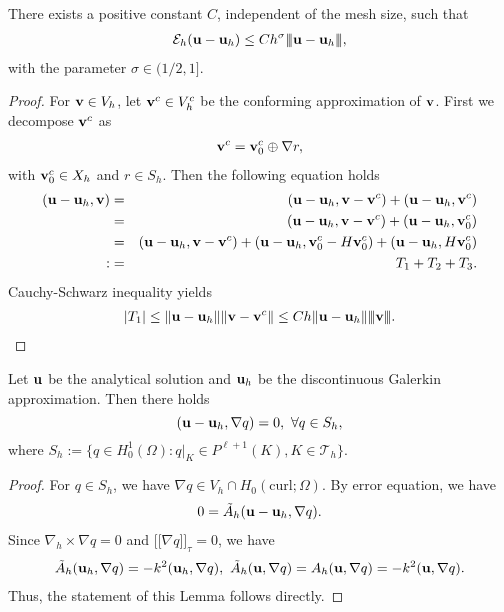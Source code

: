 \documentclass[final,leqno]{siamltex704}
\newcommand{\bv}{{\bf v}}
\def\bu{{\bf u}}
\def\bv{{\bf v}}
\def\ljump{{[\![}}
\def\rjump{{]\!]}}
\def\3bar{{|\hspace{-.02in}|\hspace{-.02in}|}}
\begin{document}
\begin{lemma}
There exists a positive constant $C$, independent of the mesh size, such that
\begin{eqnarray}
\mathcal{E}_h(\bu-\bu_h)\le Ch^{\sigma}\3bar\bu-\bu_h\3bar,
\end{eqnarray}
with the parameter $\sigma\in (1/2,1]$.
\end{lemma}
\begin{proof}
For $\bv\in V_h$, let $\bv^c\in V_h^c$ be the conforming approximation of $\bv$. First we decompose $\bv^c$ as
\begin{eqnarray}
\bv^c=\bv_0^c\oplus\nabla r,
\end{eqnarray}
with $\bv_0^c\in X_h$ and $r\in S_h$. Then the following equation holds
\begin{eqnarray*}
(\bu-\bu_h,\bv)
%
&=&(\bu-\bu_h,\bv-\bv^c)+(\bu-\bu_h,\bv^c)\\
%
&=&(\bu-\bu_h,\bv-\bv^c)+(\bu-\bu_h,\bv^c_0)\\
%
&=&(\bu-\bu_h,\bv-\bv^c)+(\bu-\bu_h,\bv^c_0-H\bv_0^c)+(\bu-\bu_h,H\bv^c_0)\\
%
:&=&T_1+T_2+T_3.
\end{eqnarray*}
Cauchy-Schwarz inequality yields
\begin{eqnarray}
|T_1|\le \|\bu-\bu_h\|\|\bv-\bv^c\|\le Ch\|\bu-\bu_h\|\3bar\bv\3bar.
\end{eqnarray}

\end{proof}

\begin{lemma}
Let $\bu$ be the analytical solution and $\bu_h$ be the discontinuous Galerkin approximation. Then there holds
$$(\bu-\bu_h,\nabla q)=0,\ \forall q\in S_h,$$
where $S_h:=\{q\in H_0^1(\Omega):q|_K\in P^{\ell+1}(K),K\in\mathcal{T}_h\}$.
\end{lemma}
\begin{proof}
For $q\in S_h$, {\color{red}we have $\nabla q\in V_h\cap H_0(\text{curl};\Omega)$.}
By error equation, we have %
\begin{eqnarray*}
0=\tilde{A}_h(\bu-\bu_h,\nabla q).%
\end{eqnarray*}
Since $\nabla_h\times\nabla q=0$ and $\ljump\nabla q\rjump_{\tau}=0$, we have
\begin{eqnarray*}
\tilde{A}_h(\bu_h,\nabla q)=-k^2(\bu_h,\nabla q),\ 
\tilde{A}_h(\bu,\nabla q)=A_h(\bu,\nabla q)=-k^2(\bu,\nabla q).
\end{eqnarray*}
Thus, the statement of this Lemma follows directly.
\end{proof}
\end{document}
